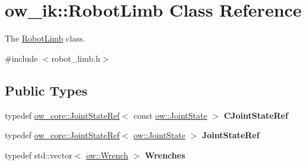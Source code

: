 \hypertarget{classow__ik_1_1RobotLimb}{}\section{ow\+\_\+ik\+:\+:Robot\+Limb Class Reference}
\label{classow__ik_1_1RobotLimb}


The \hyperlink{classow__ik_1_1RobotLimb}{Robot\+Limb} class.  




{\ttfamily \#include $<$robot\+\_\+limb.\+h$>$}

\subsection*{Public Types}
\begin{DoxyCompactItemize}
\item 
typedef \hyperlink{classow__core_1_1JointStateRef}{ow\+\_\+core\+::\+Joint\+State\+Ref}$<$ const \hyperlink{classow__core_1_1JointState}{ow\+::\+Joint\+State} $>$ {\bfseries C\+Joint\+State\+Ref}\hypertarget{classow__ik_1_1RobotLimb_a18111b2bb33c4e697b1032363cddf89f}{}\label{classow__ik_1_1RobotLimb_a18111b2bb33c4e697b1032363cddf89f}

\item 
typedef \hyperlink{classow__core_1_1JointStateRef}{ow\+\_\+core\+::\+Joint\+State\+Ref}$<$ \hyperlink{classow__core_1_1JointState}{ow\+::\+Joint\+State} $>$ {\bfseries Joint\+State\+Ref}\hypertarget{classow__ik_1_1RobotLimb_a0bbdad10e1b38a5c587bd070e6d447d9}{}\label{classow__ik_1_1RobotLimb_a0bbdad10e1b38a5c587bd070e6d447d9}

\item 
typedef std\+::vector$<$ \hyperlink{classow__core_1_1Wrench}{ow\+::\+Wrench} $>$ {\bfseries Wrenches}\hypertarget{classow__ik_1_1RobotLimb_a1d5ad36ebaa762752293813e0ac17b19}{}\label{classow__ik_1_1RobotLimb_a1d5ad36ebaa762752293813e0ac17b19}

\end{DoxyCompactItemize}
